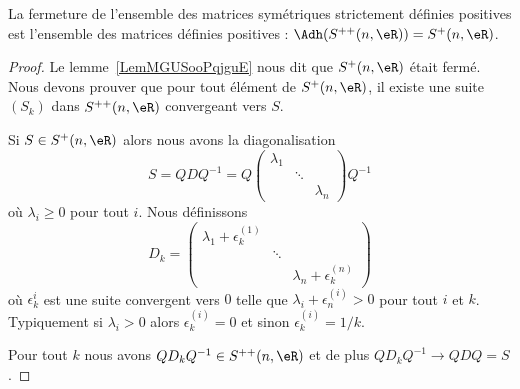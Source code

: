 \begin{lemma}   \label{LemZKJWqIP}
	La fermeture de l'ensemble des matrices symétriques strictement définies positives est l'ensemble des matrices définies positives : \( \Adh(S^{++}(n,\eR))=S^+(n,\eR)\).
\end{lemma}

\begin{proof}
	Le lemme~\ref{LemMGUSooPqjguE} nous dit que \( S^+(n,\eR)\) était fermé. Nous devons prouver que pour tout élément de \( S^+(n,\eR)\), il existe une suite \( (S_k)\) dans \( S^{++}(n,\eR)\) convergeant vers \( S\).

	Si \( S\in S^+(n,\eR)\) alors nous avons la diagonalisation
	\begin{equation}
		S=QDQ^{-1} =Q
		\begin{pmatrix}
			\lambda_1 &        &           \\
			          & \ddots &           \\
			          &        & \lambda_n
		\end{pmatrix}
		Q^{-1}
	\end{equation}
	où \( \lambda_i\geq 0\) pour tout \( i\). Nous définissons
	\begin{equation}
		D_k=
		\begin{pmatrix}
			\lambda_1+\epsilon^{(1)}_k &        &                            \\
			                           & \ddots &                            \\
			                           &        & \lambda_n+\epsilon^{(n)}_k
		\end{pmatrix}
	\end{equation}
	où \( \epsilon^{i}_k\) est une suite convergent vers \( 0\) telle que \( \lambda_i+\epsilon^{(i)}_n>0\) pour tout \( i\) et \( k\). Typiquement si \( \lambda_i>0\) alors \( \epsilon^{(i)}_k=0\) et sinon \( \epsilon^{(i)}_k=1/k\).

	Pour tout \( k\) nous avons \( QD_kQ^{-1}\in S^{++}(n,\eR)\) et de plus \( QD_kQ^{-1}\to QDQ=S\).
\end{proof}

